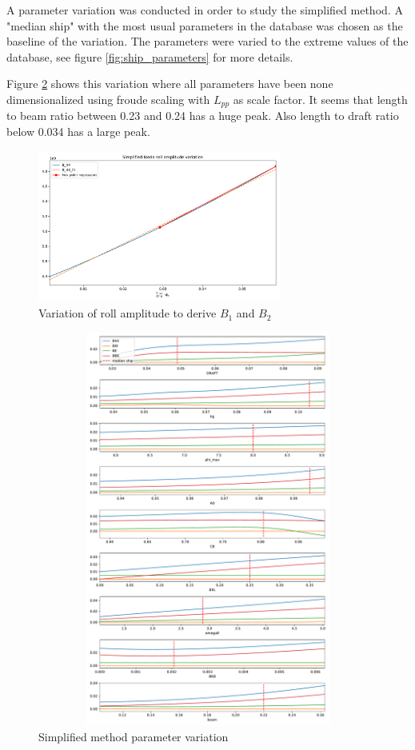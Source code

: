 A parameter variation was conducted in order to study the simplified method.
A "median ship" with the most usual parameters in the database was chosen as the baseline of the variation. The parameters were varied to the extreme values of the database, see figure \ref{fig:ship_parameters} for more details. 

Figure \ref{fig:ikeda_variation} shows this variation where all parameters have been none dimensionalized using froude scaling with $L_{pp}$ as scale factor. 
It seems that length to beam ratio between 0.23 and 0.24 has a huge peak. Also length to draft ratio below 0.034 has a large peak. 

\begin{figure}[H]
    \centering
    \includegraphics[height=5cm, width=8cm]{figures/ikeda_B_1_B_2.pdf}
    \vspace{-0.5cm}
    \caption{Variation of roll amplitude to derive $B_1$ and $B_2$}
    \label{fig:ikeda_B_1_B2}
\end{figure}

\begin{figure}[H]
    \centering
    \includegraphics[height=13cm, width=15cm]{figures/ikeda_variation.pdf}
    \caption{Simplified method parameter variation}
    \label{fig:ikeda_variation}
\end{figure}

